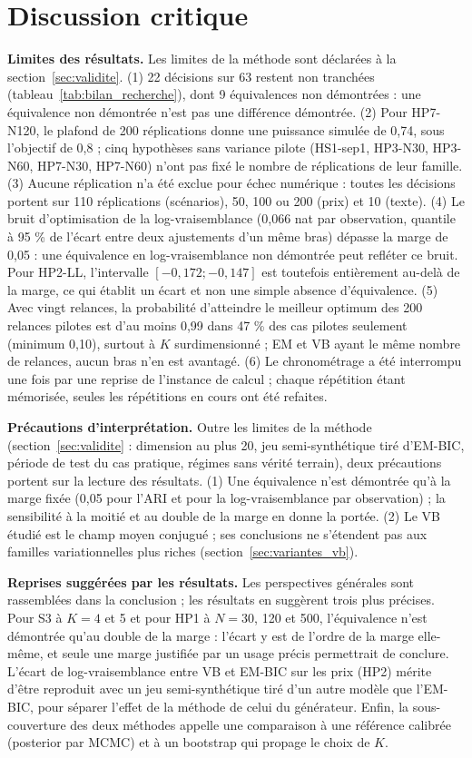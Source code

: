 \section{Discussion critique}\label{sec:discussion_critique}
\textbf{Limites des résultats. }Les limites de la méthode sont déclarées à la section~\ref{sec:validite}.
(1) 22 décisions sur 63 restent non tranchées (tableau~\ref{tab:bilan_recherche}), dont 9 équivalences non démontrées : une équivalence non démontrée n'est pas une différence démontrée. (2) Pour HP7-N120, le plafond de 200 réplications donne une puissance simulée de 0,74, sous l'objectif de 0,8 ; cinq hypothèses sans variance pilote (HS1-sep1, HP3-N30, HP3-N60, HP7-N30, HP7-N60) n'ont pas fixé le nombre de réplications de leur famille. (3) Aucune réplication n'a été exclue pour échec numérique : toutes les décisions portent sur 110 réplications (scénarios), 50, 100 ou 200 (prix) et 10 (texte). (4) Le bruit d'optimisation de la log-vraisemblance (0,066 nat par observation, quantile à 95 \% de l'écart entre deux ajustements d'un même bras) dépasse la marge de 0,05 : une équivalence en log-vraisemblance non démontrée peut refléter ce bruit. Pour HP2-LL, l'intervalle $[-0{,}172 ; -0{,}147]$ est toutefois entièrement au-delà de la marge, ce qui établit un écart et non une simple absence d'équivalence. (5) Avec vingt relances, la probabilité d'atteindre le meilleur optimum des 200 relances pilotes est d'au moins 0,99 dans 47 \% des cas pilotes seulement (minimum 0,10), surtout à $K$ surdimensionné ; EM et VB ayant le même nombre de relances, aucun bras n'en est avantagé. (6) Le chronométrage a été interrompu une fois par une reprise de l'instance de calcul ; chaque répétition étant mémorisée, seules les répétitions en cours ont été refaites.

\textbf{Précautions d'interprétation. }Outre les limites de la méthode (section~\ref{sec:validite} : dimension au plus 20, jeu semi-synthétique tiré d'EM-BIC, période de test du cas pratique, régimes sans vérité terrain), deux précautions portent sur la lecture des résultats. (1) Une équivalence n'est démontrée qu'à la marge fixée (0,05 pour l'ARI et pour la log-vraisemblance par observation) ; la sensibilité à la moitié et au double de la marge en donne la portée. (2) Le VB étudié est le champ moyen conjugué ; ses conclusions ne s'étendent pas aux familles variationnelles plus riches (section~\ref{sec:variantes_vb}).

\textbf{Reprises suggérées par les résultats. }Les perspectives générales sont rassemblées dans la conclusion ; les résultats en suggèrent trois plus précises. Pour S3 à $K = 4$ et 5 et pour HP1 à $N = 30$, 120 et 500, l'équivalence n'est démontrée qu'au double de la marge : l'écart y est de l'ordre de la marge elle-même, et seule une marge justifiée par un usage précis permettrait de conclure. L'écart de log-vraisemblance entre VB et EM-BIC sur les prix (HP2) mérite d'être reproduit avec un jeu semi-synthétique tiré d'un autre modèle que l'EM-BIC, pour séparer l'effet de la méthode de celui du générateur. Enfin, la sous-couverture des deux méthodes appelle une comparaison à une référence calibrée (posterior par MCMC) et à un bootstrap qui propage le choix de $K$.


